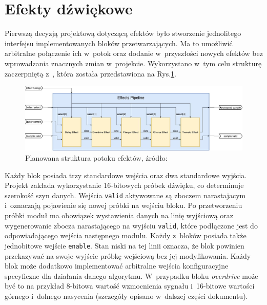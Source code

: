 
\section{Efekty dźwiękowe}

Pierwszą decyzją projektową dotyczącą efektów było stworzenie jednolitego interfejsu implementowanych bloków przetwarzających. Ma to umożliwić arbitralne połączenie ich w~potok oraz dodanie w~przyszłości nowych efektów bez wprowadzania znacznych zmian w~projekcie. Wykorzystano w~tym celu strukturę zaczerpniętą z~\cite{fpga_pedal}, która została przedstawiona na Rys.\ref{effects-pipe}.

\vspace{0.5cm}
\begin{figure}[ht]
    \centering
    \includegraphics[scale=0.25]{img/theoretical-analysis/pipe.jpg}
    \captionsetup{format=plain,justification=centering}
    \caption{Planowana struktura potoku efektów, źródło: \cite{fpga_pedal}}
    \label{effects-pipe}
\end{figure}
\vspace{0.5cm}

Każdy blok posiada trzy standardowe wejścia oraz dwa standardowe wyjścia. Projekt zakłada wykorzystanie 16-bitowych próbek dźwięku, co determinuje szerokość szyn danych. Wejścia \verb|valid| aktywowane są zboczem narastajacym i~oznaczają pojawienie się nowej próbki na wejściu bloku. Po przetworzeniu próbki moduł ma obowiązek wystawienia danych na linię wyjściową oraz wygenerowanie zbocza narastającego na wyjściu \verb|valid|, które podłączone jest do odpowiadającego wejścia następnego modułu. Każdy z~bloków posiada także jednobitowe wejście \verb|enable|. Stan niski na tej linii oznacza, że blok powinien przekazywać na swoje wyjście próbkę wejściową bez jej modyfikowania. Każdy blok może dodatkowo implementować arbitralne wejścia konfiguracyjne specyficzne dla działania danego algorytmu. W~przypadku bloku \textit{overdrive} może być to na przykład 8-bitowa wartość wzmocnienia sygnału i~16-bitowe wartości górnego i~dolnego nasycenia (szczegóły opisano w~dalszej części dokumentu).


